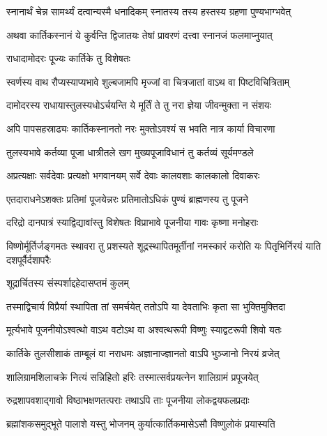 \twolineshloka
{स्नानार्थं चेन्न सामर्थ्यं दत्वान्यस्मै धनादिकम्}
{स्नातस्य तस्य हस्तस्य ग्रहणा पुण्यभाग्भवेत्} %

\twolineshloka
{अथवा कार्तिकस्नानं ये कुर्वन्ति द्विजातयः}
{तेषां प्रावरणं दत्त्वा स्नानजं फलमाप्नुयात्} %


\onelineshloka
{राधादामोदरः पूज्यः कार्तिके तु विशेषतः} %

\twolineshloka
{स्वर्णस्य वाथ रौप्यस्याप्यभावे शुल्बजामपि}
{मृज्जां वा चित्रजातां वाऽथ वा पिष्टविचित्रिताम्} %

\twolineshloka
{दामोदरस्य राधायास्तुलस्यधोऽर्चयन्ति ये}
{मूर्तिं ते तु नरा ज्ञेया जीवन्मुक्ता न संशयः} %

\twolineshloka
{अपि पापसहस्राढ्यः कार्तिकस्नानतो नरः}
{मुक्तोऽवश्यं स भवति नात्र कार्या विचारणा} %

\twolineshloka
{तुलस्यभावे कर्तव्या पूजा धात्रीतले खग}
{मुख्यपूजाविधानं तु कर्तव्यं सूर्यमण्डले} %

\twolineshloka
{अप्रत्यक्षाः सर्वदेवाः प्रत्यक्षो भगवानयम्}
{सर्वे देवाः कालवशाः कालकालो दिवाकरः} %

\twolineshloka
{एतदाराधनेऽशक्तः प्रतिमां पूजयेन्नरः}
{प्रतिमातोऽधिकं पुण्यं ब्राह्मणस्य तु पूजने} %

\twolineshloka
{दरिद्रो दानपात्रं स्याद्विद्यावांस्तु विशेषतः}
{विप्राभावे पूजनीया गावः कृष्णा मनोहराः} %

\threelineshloka
{विष्णोर्मूर्तिर्जङ्गमतः स्थावरा तु प्रशस्यते}
{शूद्रस्थापितमूर्तीनां नमस्कारं करोति यः}
{पितृभिर्निरयं याति दशपूर्वैर्दशापरैः} %


\onelineshloka
{शूद्रार्चितस्य संस्पर्शाद्दहेदासप्तमं कुलम्} %

\twolineshloka
{तस्माद्विचार्य विप्रैर्या स्थापिता तां समर्चयेत्}
{ततोऽपि या देवताभिः कृता सा भुक्तिमुक्तिदा} %

\twolineshloka
{मूर्त्यभावे पूजनीयोऽश्वत्थो वाऽथ वटोऽथ वा}
{अश्वत्थरूपी विष्णुः स्याद्वटरूपी शिवो यतः} %

\twolineshloka
{कार्तिके तुलसीशाकं ताम्बूलं वा नराधमः}
{अज्ञानाज्ज्ञानतो वाऽपि भुञ्जानो निरयं व्रजेत्} %

\twolineshloka
{शालिग्रामशिलाचक्रे नित्यं सन्निहितो हरिः}
{तस्मात्सर्वप्रयत्नेन शालिग्रामं प्रपूजयेत्} %

\twolineshloka
{रुद्रशापवशाद्गावो विष्ठाभक्षणतत्पराः}
{तथाऽपि ताः पूजनीया लोकद्वयफलप्रदाः} %

\twolineshloka
{ब्रह्मांशकसमुद्भूते पालाशे यस्तु भोजनम्}
{कुर्यात्कार्तिकमासेऽसौ विष्णुलोकं प्रयास्यति} %

